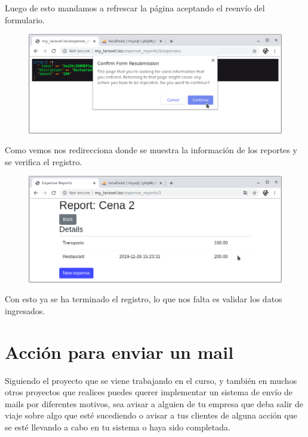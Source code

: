 \documentclass{article}
\begin{document}
Luego de esto mandamos a refrescar la página aceptando el reenvío del
formulario.\\

\begin{figure}[h!]
  \centering
  \includegraphics[scale=0.5]{./Pictures/117_refrescar.png}
\end{figure}

Como vemos nos redirecciona donde se muestra la información de los reportes y
se verifica el registro.\\

\begin{figure}[h!]
  \centering
  \includegraphics[scale=0.5]{./Pictures/118_store_ok.png}
\end{figure}

Con esto ya se ha terminado el registro, lo que nos falta es validar los datos
ingresados.

\newpage


\section{Acción para enviar un mail}%
Siguiendo el proyecto que se viene trabajando en el curso, y también en muchos
otros proyectos que realices puedes querer implementar un sistema de envío de
mails por diferentes motivos, sea avisar a alguien de tu empresa que deba salir
de viaje sobre algo que esté sucediendo o avisar a tus clientes de alguna
acción que se esté llevando a cabo en tu sistema o haya sido completada.\\
\end{document}

